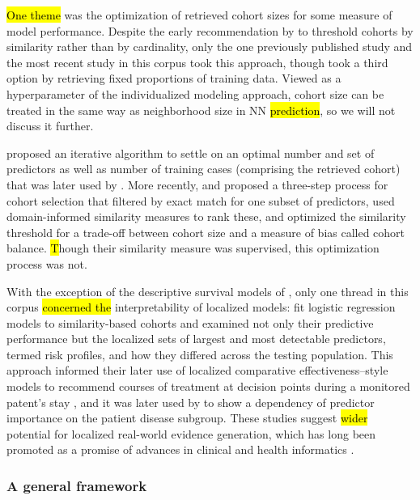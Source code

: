 \documentclass[sn-mathphys,Numbered,pdflatex]{sn-jnl}
\theoremstyle{remark}
\theoremstyle{definition}
\begin{document}
\hl{One theme} was the optimization of retrieved cohort sizes for some
measure of model performance. Despite the early recommendation by
\citet{Park2006} to threshold cohorts by similarity rather than by
cardinality, only the one previously published study
\citep{Mariuzzi1997} and the most recent study \citep{Tang2021, Ng2021}
in this corpus took this approach, though \citet{Liu2022} took a third
option by retrieving fixed proportions of training data. Viewed as a
hyperparameter of the individualized modeling approach, cohort size can
be treated in the same way as neighborhood size in NN \hl{prediction},
so we will not discuss it further.

\citet{Kasabov2010} proposed an iterative algorithm to settle on an
optimal number and set of predictors as well as number of training cases
(comprising the retrieved cohort) that was later used by
\citet{Liang2015}. More recently, \citet{Tang2021} and \citet{Ng2021}
proposed a three-step process for cohort selection that filtered by
exact match for one subset of predictors, used domain-informed
similarity measures to rank these, and optimized the similarity
threshold for a trade-off between cohort size and a measure of bias
called cohort balance. \hl{T}hough their similarity measure was
supervised, this optimization process was not.

With the exception of the descriptive survival models of
\citet{Mariuzzi1997}, only one thread in this corpus \hl{concerned the}
interpretability of localized models: \citet{Ng2015} fit logistic
regression models to similarity-based cohorts and examined not only
their predictive performance but the localized sets of largest and most
detectable predictors, termed risk profiles, and how they differed
across the testing population. This approach informed their later use of
localized comparative effectiveness--style models to recommend courses
of treatment at decision points during a monitored patent's stay
\citep{Tang2021, Ng2021}, and it was later used by \citet{Liu2022} to
show a dependency of predictor importance on the patient disease
subgroup. These studies suggest \hl{wider} potential for localized
real-world evidence generation, which has long been promoted as a
promise of advances in clinical and health informatics
\citep{Longhurst2014}.

\subsubsection{A general framework}\label{a-general-framework}
\end{document}
